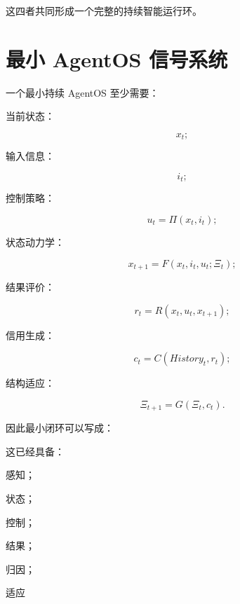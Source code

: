\begin{statementbox}
\centering
{}
\end{statementbox}

这四者共同形成一个完整的持续智能运行环。

\section{最小 AgentOS 信号系统}

一个最小持续 AgentOS 至少需要：

当前状态：

\[
x_t;
\]

输入信息：

\[
i_t;
\]

控制策略：

\[
u_t
=
\Pi(x_t,i_t);
\]

状态动力学：

\[
x_{t+1}
=
F(x_t,i_t,u_t;\Xi_t);
\]

结果评价：

\[
r_t
=
R(
x_t,
u_t,
x_{t+1}
);
\]

信用生成：

\[
c_t
=
C(
History_t,
r_t
);
\]

结构适应：

\[
\Xi_{t+1}
=
G(
\Xi_t,
c_t
).
\]

因此最小闭环可以写成：

\begin{statementbox}
\centering
{}
\end{statementbox}

这已经具备：

感知；

状态；

控制；

结果；

归因；

适应

